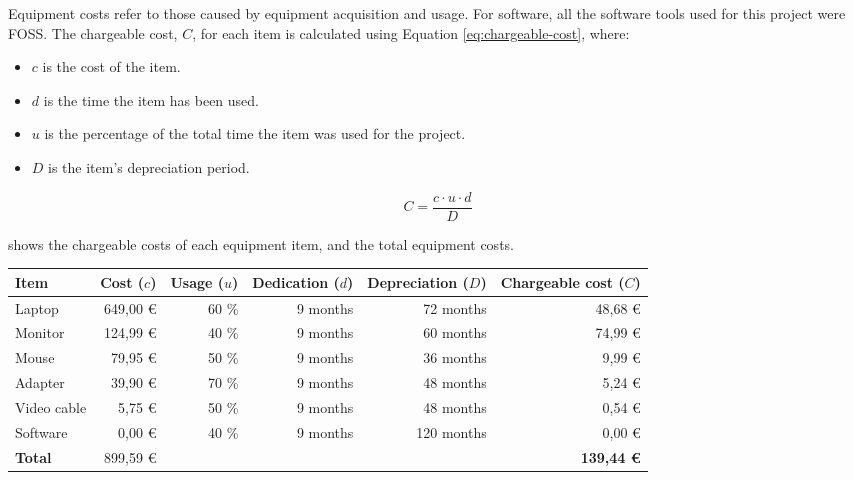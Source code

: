 Equipment costs refer to those caused by equipment acquisition and usage. For software, all the software tools used for this project were \gls{FOSS}. The chargeable cost, $C$, for each item is calculated using Equation \eqref{eq:chargeable-cost}, where:
\begin{itemize}
  \item $c$ is the cost of the item.
  \item $d$ is the time the item has been used.
  \item $u$ is the percentage of the total time the item was used for the project.
  \item $D$ is the item's depreciation period.
\end{itemize}

\begin{equation}\label{eq:chargeable-cost}
  C = \frac{c \cdot u \cdot d}{D}
\end{equation}

 shows the chargeable costs of each equipment item, and the total equipment costs.

\begin{table}[htb]
    {
      \begin{adjustbox}{max width=\textwidth}  %
        \begin{tabular}{lrrrrr}
          \toprule
          \textbf{Item} & \textbf{Cost ($c$)} & \textbf{Usage ($u$)} & \textbf{Dedication ($d$)} & \textbf{Depreciation ($D$)} & \textbf{Chargeable cost ($C$)}   \\
          \midrule
          Laptop      & 649,00 € & 60 \% & 9 months &  72 months &  48,68 € \\
          Monitor     & 124,99 € & 40 \% & 9 months &  60 months &  74,99 € \\
          Mouse       &  79,95 € & 50 \% & 9 months &  36 months &   9,99 € \\
          Adapter     &  39,90 € & 70 \% & 9 months &  48 months &   5,24 € \\
          Video cable &   5,75 € & 50 \% & 9 months &  48 months &   0,54 € \\
          Software    &   0,00 € & 40 \% & 9 months & 120 months &   0,00 € \\
          \midrule
          \textbf{Total}
                      & 899,59 € &       &          &           &\textbf{139,44 €} \\
          \bottomrule
        \end{tabular}
      \end{adjustbox}
    }
\end{table}


